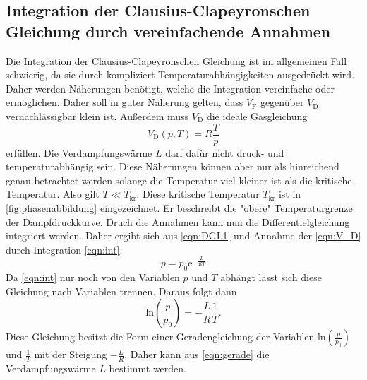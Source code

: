 \subsection{Integration der Clausius-Clapeyronschen Gleichung durch vereinfachende Annahmen}
\label{subsec:T_int}
Die Integration der Clausius-Clapeyronschen Gleichung ist im allgemeinen Fall schwierig, da sie durch kompliziert Temperaturabhängigkeiten ausgedrückt wird. Daher werden Näherungen benötigt, welche
die Integration vereinfache oder ermöglichen. Daher soll in guter Näherung gelten, dass $V_\text{F}$ gegenüber $V_\text{D}$ vernachlässigbar klein ist. Außerdem muss $V_\text{D}$ die ideale Gasgleichung
\begin{equation}
    \label{eqn:V_D}
    V_\text{D}(p,T) = R\frac{T}{p}
\end{equation} 
erfüllen. Die Verdampfungswärme $L$ darf dafür nicht druck- und temperaturabhängig sein. Diese Näherungen können aber nur als hinreichend genau betrachtet werden solange die Temperatur
viel kleiner ist als die kritische Temperatur. Also gilt $T \ll T_\text{kr}$. Diese kritische Temperatur $T_\text{kr}$ ist in \autoref{fig:phasenabbildung} eingezeichnet. Er beschreibt die "obere"
Temperaturgrenze der Dampfdruckkurve. Druch die Annahmen kann nun die Differentielgleichung integriert werden. Daher ergibt sich aus \autoref{eqn:DGL1} und Annahme der \autoref{eqn:V_D} durch Integration
\autoref{eqn:int}.
\begin{equation}
    \label{eqn:int}
    p = p_0\text{e}^{-\frac{L}{RT}}
\end{equation}
Da \autoref{eqn:int} nur noch von den Variablen $p$ und $T$ abhängt lässt sich diese Gleichung nach Variablen trennen. Daraus folgt dann 
\begin{equation}
    \label{eqn:gerade}
    \text{ln}\left(\frac{p}{p_0}\right) = -\frac{L}{R}\frac{1}{T}.
\end{equation}
Diese Gleichung besitzt die Form einer Geradengleichung der Variablen $\text{ln}\left(\frac{p}{p_0}\right)$ und $\frac{1}{T}$ mit der Steigung $-\frac{L}{R}$. Daher kann aus \autoref{eqn:gerade} die 
Verdampfungswärme $L$ bestimmt werden.